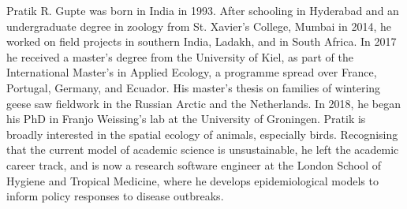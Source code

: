 \label{ch:pubs}

\begingroup

Pratik R. Gupte was born in India in 1993.
After schooling in Hyderabad and an undergraduate degree in zoology from St. Xavier's College, Mumbai in 2014, he worked on field projects in southern India, Ladakh, and in South Africa.
In 2017 he received a master's degree from the University of Kiel, as part of the International Master's in Applied Ecology, a programme spread over France, Portugal, Germany, and Ecuador.
His master's thesis on families of wintering geese saw fieldwork in the Russian Arctic and the Netherlands.
In 2018, he began his PhD in Franjo Weissing's lab at the University of Groningen.
Pratik is broadly interested in the spatial ecology of animals, especially birds.
Recognising that the current model of academic science is unsustainable, he left the academic career track, and is now a research software engineer at the London School of Hygiene and Tropical Medicine, where he develops epidemiological models to inform policy responses to disease outbreaks.

\let\clearpage\relax
\let\cleardoublepage\relax
\let\cleardoublepage\relax


\begin{refsection}
    \small
    \nocite{gupte2021a,gupte2022c,gupte2022d,thaker2019,nathan2022,netz2022,ramesh2022,
        bijleveld2021,rimbach2022un,gupte2019} %
    \printbibliography[title=Author Publications]
\end{refsection}

\begin{refsection}
    \small
    \nocite{gupte2022,gupte2022e,gupte2022b,gupte2021b,gupte2020a,gupte2022f,netz2021b,netz2022a,netz2021b} %
    \printbibliography[title=Data and Code]
\end{refsection}

\endgroup

{ \begin{center}  \end{center} }

